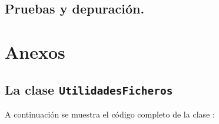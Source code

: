\documentclass[a4paper,12pt,spanish]{sphinxmanual}
\begin{document}
\section{Pruebas y depuración.}
\label{textos/tema5:pruebas-y-depuracion}

\chapter{Anexos}
\label{textos/anexos:anexos}\label{textos/anexos::doc}

\section{La clase \texttt{UtilidadesFicheros}}
\label{textos/anexos:la-clase-utilidadesficheros}
A continuación se muestra el código completo de la clase :
\end{document}
